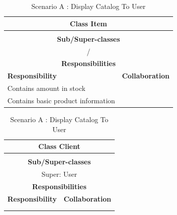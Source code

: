 \documentclass[•]{article}
\begin{document}
\begin{table}
\begin{tabular}{|l||l|}
\hline
\multicolumn{2}{|c|}{ Class \textbf{Item} }\\ \hline
\multicolumn{2}{|c|}{}\\ \hline
\multicolumn{2}{|c|}{ \textbf{Sub/Super-classes} }\\ \hline
\multicolumn{2}{|c|}{/} \\ \hline
\multicolumn{2}{|c|}{ \textbf{Responsibilities}}\\ \hline
\textbf{Responsibility} & \textbf{Collaboration} \\ \hline
Contains amount in stock &  \\ \hline
Contains basic product information &  \\ \hline
\end{tabular}
\begin{tabular}{|l||l|}
\hline
\multicolumn{2}{|c|}{ Class \textbf{Client} }\\ \hline
\multicolumn{2}{|c|}{}\\ \hline
\multicolumn{2}{|c|}{ \textbf{Sub/Super-classes} }\\ \hline
\multicolumn{2}{|c|}{Super: User} \\ \hline
\multicolumn{2}{|c|}{ \textbf{Responsibilities}}\\ \hline
\textbf{Responsibility} & \textbf{Collaboration} \\ \hline
 &  \\ 
 &  \\ 
 \hline
\end{tabular}
\caption{Scenario A : Display Catalog To User}
\label{scenarioA}
\end{table}
\end{document}
